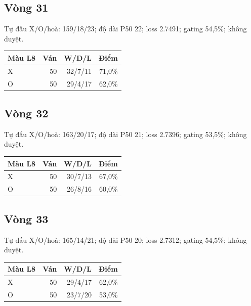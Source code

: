 \subsection*{Vòng 31}

Tự đấu X/O/hoà: 159/18/23; độ dài P50 22; loss 2.7491; gating 54,5\%; không duyệt.

\begin{center}\scriptsize\begin{tabular}{@{}lrrr@{}}\toprule

Màu L8 & Ván & W/D/L & Điểm \\

\midrule

X & 50 & 32/7/11 & 71,0\% \\

O & 50 & 29/4/17 & 62,0\% \\

\bottomrule\end{tabular}\end{center}

\subsection*{Vòng 32}

Tự đấu X/O/hoà: 163/20/17; độ dài P50 21; loss 2.7396; gating 53,5\%; không duyệt.

\begin{center}\scriptsize\begin{tabular}{@{}lrrr@{}}\toprule

Màu L8 & Ván & W/D/L & Điểm \\

\midrule

X & 50 & 30/7/13 & 67,0\% \\

O & 50 & 26/8/16 & 60,0\% \\

\bottomrule\end{tabular}\end{center}

\subsection*{Vòng 33}

Tự đấu X/O/hoà: 165/14/21; độ dài P50 20; loss 2.7312; gating 54,5\%; không duyệt.

\begin{center}\scriptsize\begin{tabular}{@{}lrrr@{}}\toprule

Màu L8 & Ván & W/D/L & Điểm \\

\midrule

X & 50 & 29/4/17 & 62,0\% \\

O & 50 & 23/7/20 & 53,0\% \\

\bottomrule\end{tabular}\end{center}

